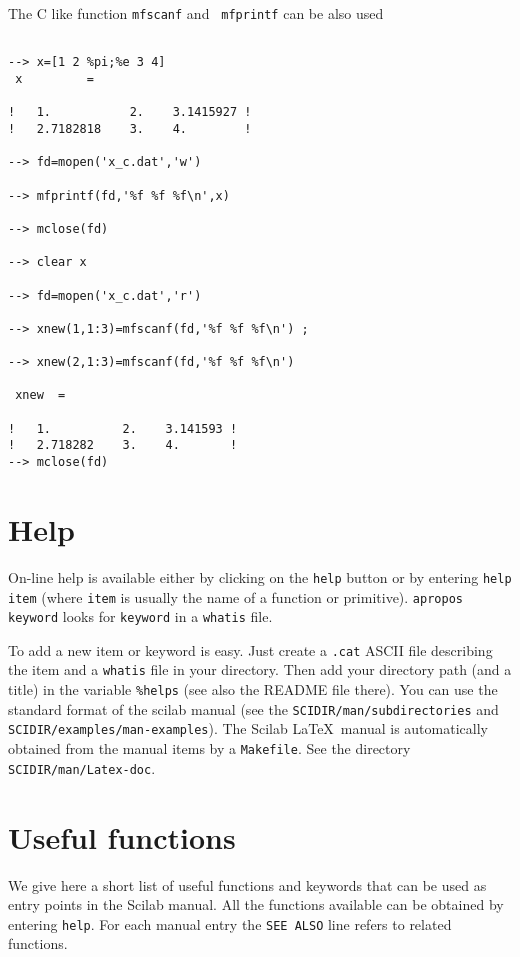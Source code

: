 The C like function {\tt mfscanf}  and {\tt
mfprintf}  can be also used
\begin{verbatim}
 
--> x=[1 2 %pi;%e 3 4]
 x         =
 
!   1.           2.    3.1415927 !
!   2.7182818    3.    4.        !
 
--> fd=mopen('x_c.dat','w')

--> mfprintf(fd,'%f %f %f\n',x)

--> mclose(fd)
 
--> clear x
 
--> fd=mopen('x_c.dat','r')

--> xnew(1,1:3)=mfscanf(fd,'%f %f %f\n') ;

--> xnew(2,1:3)=mfscanf(fd,'%f %f %f\n')

 xnew  =
 
!   1.          2.    3.141593 !
!   2.718282    3.    4.       !
--> mclose(fd)
\end{verbatim}


\section{Help}
On-line help is available either by clicking on the 
{\tt help}
button or by entering {\tt help item} (where {\tt item} is usually the 
name of a function or primitive). {\tt apropos
keyword} looks 
for {\tt keyword} in a {\tt whatis} file. 

 To add a new item or keyword is easy.
Just create a {\tt .cat} ASCII file describing the item and a 
{\tt whatis} file in your directory. 
Then add your directory path
(and a title) in the variable \verb!%helps! (see also the README file
there). You can use the standard format of the scilab manual
(see the {\tt SCIDIR/man/subdirectories} 
and {\tt SCIDIR/examples/man-examples}).
The Scilab \LaTeX\   manual is automatically obtained from the
manual items by a {\tt Makefile}. 
See the directory {\tt SCIDIR/man/Latex-doc}. 

\section{Useful functions}

We give here a short list of useful functions and keywords that can be used
as entry points in the Scilab manual. All the functions available 
can be obtained by entering {\tt help}. For each manual entry the
{\tt SEE ALSO} line refers to related functions.

